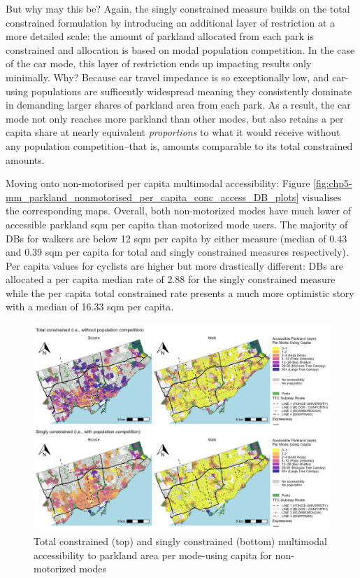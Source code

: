 \documentclass[
11pt, %
oneside, %
english, %
singlespacing, %
]{macthesis} %
\begin{document}
But why may this be? Again, the singly constrained measure builds on the total constrained formulation by introducing an additional layer of restriction at a more detailed scale: the amount of parkland allocated from each park is constrained and allocation is based on modal population competition. In the case of the car mode, this layer of restriction ends up impacting results only minimally. Why? Because car travel impedance is so exceptionally low, and car-using populations are sufficently widespread meaning they consistently dominate in demanding larger shares of parkland area from each park. As a result, the car mode not only reaches more parkland than other modes, but also retains a per capita share at nearly equivalent \emph{proportions} to what it would receive without any population competition--that is, amounts comparable to its total constrained amounts.

Moving onto non-motorised per capita multimodal accessibility: Figure \ref{fig:chp5-mm_parkland_nonmotorised_per_capita_conc_access_DB_plots} visualises the corresponding maps. Overall, both non-motorized modes have much lower of accessible parkland sqm per capita than motorized mode users. The majority of DBs for walkers are below 12 sqm per capita by either measure (median of 0.43 and 0.39 sqm per capita for total and singly constrained measures respectively). Per capita values for cyclists are higher but more drastically different: DBs are allocated a per capita median rate of 2.88 for the singly constrained measure while the per capita total constrained rate presents a much more optimistic story with a median of 16.33 sqm per capita.

\begin{figure}

{\centering \includegraphics[width=6in]{./data/figures/chp5-mm_parkland_nonmotorised_per_capita_conc_access_DB_plots} 

}

\caption{\label{fig:chp5-mm_parkland_nonmotorised_per_capita_conc_access_DB_plots} Total constrained (top) and singly constrained (bottom) multimodal accessibility to parkland area per mode-using capita for non-motorized modes}\label{fig:unnamed-chunk-81}
\end{figure}
\end{document}
